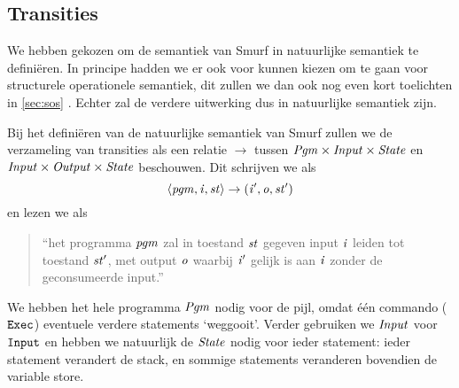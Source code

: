 \subsection{Transities}
\label{sec:def:trans}
We hebben gekozen om de semantiek van Smurf in natuurlijke semantiek te definiëren. In principe hadden we er ook voor kunnen kiezen om te gaan voor structurele operationele semantiek, dit zullen we dan ook nog even kort toelichten in \autoref{sec:sos} . Echter zal de verdere uitwerking dus in natuurlijke semantiek zijn. 

\medskip

Bij het definiëren van de natuurlijke semantiek van Smurf zullen we de
verzameling van transities als een relatie $\to$ tussen
$\mathit{Pgm}\times\mathit{Input}\times\mathit{State}$ en $\mathit{Input}\times\mathit{Output}\times\mathit{State}$ beschouwen.
Dit schrijven we als
$$\left\langle\mathit{pgm},\mathit{i},\mathit{st}\right\rangle\to\left(\mathit{i}',\mathit{o},\mathit{st}'\right)$$
en lezen we als
\begin{quote}
	``het programma $\mathit{pgm}$ zal in toestand $\mathit{st}$ gegeven input $\mathit{i}$ leiden tot
	toestand $\mathit{st}'$, met output $\mathit{o}$ waarbij $\mathit{i}'$ gelijk is aan $\mathit{i}$ zonder
	de geconsumeerde input.''
\end{quote}

We hebben het hele programma $\mathit{Pgm}$ nodig voor de pijl, omdat één commando
($\texttt{Exec}$) eventuele verdere statements `weggooit'. %
Verder gebruiken we $\mathit{Input}$ voor $\texttt{Input}$ en hebben we natuurlijk de
$\mathit{State}$ nodig voor ieder statement: ieder statement verandert de stack, en
sommige statements veranderen bovendien de variable store.

